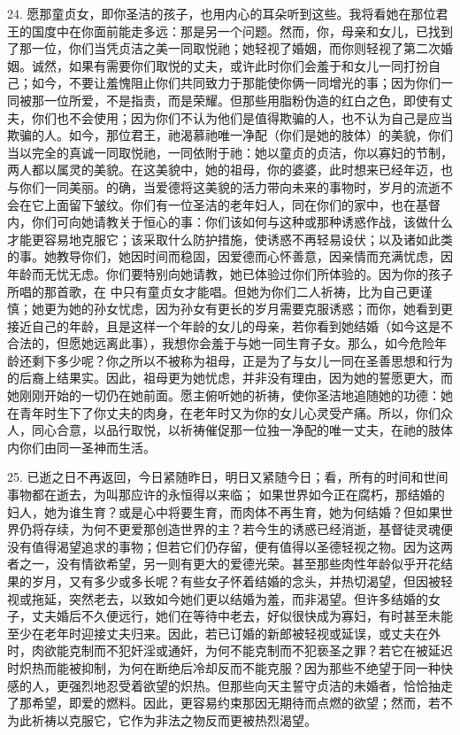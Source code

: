 24. 愿那童贞女，即你圣洁的孩子，也用内心的耳朵听到这些。我将看她在那位君王的国度中在你面前能走多远：那是另一个问题。然而，你，母亲和女儿，已找到了那一位，你们当凭贞洁之美一同取悦祂；她轻视了婚姻，而你则轻视了第二次婚姻。诚然，如果有需要你们取悦的丈夫，或许此时你们会羞于和女儿一同打扮自己；如今，不要让羞愧阻止你们共同致力于那能使你俩一同增光的事；因为你们一同被那一位所爱，不是指责，而是荣耀。但那些用脂粉伪造的红白之色，即使有丈夫，你们也不会使用；因为你们不认为他们是值得欺骗的人，也不认为自己是应当欺骗的人。如今，那位君王，祂渴慕祂唯一净配（你们是她的肢体）的美貌，你们当以完全的真诚一同取悦祂，一同依附于祂：她以童贞的贞洁，你以寡妇的节制，两人都以属灵的美貌。在这美貌中，她的祖母，你的婆婆，此时想来已经年迈，也与你们一同美丽。的确，当爱德将这美貌的活力带向未来的事物时，岁月的流逝不会在它上面留下皱纹。你们有一位圣洁的老年妇人，同在你们的家中，也在基督内，你们可向她请教关于恒心的事：你们该如何与这种或那种诱惑作战，该做什么才能更容易地克服它；该采取什么防护措施，使诱惑不再轻易设伏；以及诸如此类的事。她教导你们，她因时间而稳固，因爱德而心怀善意，因亲情而充满忧虑，因年龄而无忧无虑。你们要特别向她请教，她已体验过你们所体验的。因为你的孩子所唱的那首歌，在  中只有童贞女才能唱。但她为你们二人祈祷，比为自己更谨慎；她更为她的孙女忧虑，因为孙女有更长的岁月需要克服诱惑；而你，她看到更接近自己的年龄，且是这样一个年龄的女儿的母亲，若你看到她结婚（如今这是不合法的，但愿她远离此事），我想你会羞于与她一同生育子女。那么，如今危险年龄还剩下多少呢？你之所以不被称为祖母，正是为了与女儿一同在圣善思想和行为的后裔上结果实。因此，祖母更为她忧虑，并非没有理由，因为她的誓愿更大，而她刚刚开始的一切仍在她前面。愿主俯听她的祈祷，使你圣洁地追随她的功德：她在青年时生下了你丈夫的肉身，在老年时又为你的女儿心灵受产痛。所以，你们众人，同心合意，以品行取悦，以祈祷催促那一位独一净配的唯一丈夫，在祂的肢体内你们由同一圣神而生活。\par

25. 已逝之日不再返回，今日紧随昨日，明日又紧随今日；看，所有的时间和世间事物都在逝去，为叫那应许的永恒得以来临； 如果世界如今正在腐朽，那结婚的妇人，她为谁生育？或是心中将要生育，而肉体不再生育，她为何结婚？但如果世界仍将存续，为何不更爱那创造世界的主？若今生的诱惑已经消逝，基督徒灵魂便没有值得渴望追求的事物；但若它们仍存留，便有值得以圣德轻视之物。因为这两者之一，没有情欲希望，另一则有更大的爱德光荣。甚至那些肉性年龄似乎开花结果的岁月，又有多少或多长呢？有些女子怀着结婚的念头，并热切渴望，但因被轻视或拖延，突然老去，以致如今她们更以结婚为羞，而非渴望。但许多结婚的女子，丈夫婚后不久便远行，她们在等待中老去，好似很快成为寡妇，有时甚至未能至少在老年时迎接丈夫归来。因此，若已订婚的新郎被轻视或延误，或丈夫在外时，肉欲能克制而不犯奸淫或通奸，为何不能克制而不犯亵圣之罪？若它在被延迟时炽热而能被抑制，为何在断绝后冷却反而不能克服？因为那些不绝望于同一种快感的人，更强烈地忍受着欲望的炽热。但那些向天主誓守贞洁的未婚者，恰恰抽走了那希望，即爱的燃料。因此，更容易约束那因无期待而点燃的欲望；然而，若不为此祈祷以克服它，它作为非法之物反而更被热烈渴望。\par

